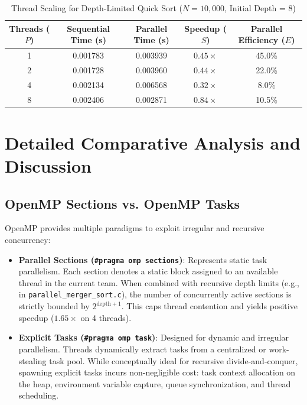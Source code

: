 \documentclass[12pt]{article}
\begin{document}
\begin{table}[H]
\centering
\caption{Thread Scaling for Depth-Limited Quick Sort ($N = 10,000$, Initial Depth = 8)}
\vspace{4pt}
\begin{tabular}{@{}ccccc@{}}
\toprule
\textbf{Threads ($P$)} & \textbf{Sequential Time (s)} & \textbf{Parallel Time (s)} & \textbf{Speedup ($S$)} & \textbf{Parallel Efficiency ($E$)} \\
\midrule
1 & 0.001783 & 0.003939 & $0.45\times$ & 45.0\% \\
2 & 0.001728 & 0.003960 & $0.44\times$ & 22.0\% \\
4 & 0.002134 & 0.006568 & $0.32\times$ & 8.0\% \\
8 & 0.002406 & 0.002871 & $0.84\times$ & 10.5\% \\
\bottomrule
\end{tabular}
\label{tab:depth_table}
\end{table}

\section{Detailed Comparative Analysis and Discussion}

\subsection{OpenMP Sections vs. OpenMP Tasks}
OpenMP provides multiple paradigms to exploit irregular and recursive concurrency:
\begin{itemize}
    \item \textbf{Parallel Sections (\texttt{\#pragma omp sections})}: Represents static task parallelism. Each section denotes a static block assigned to an available thread in the current team. When combined with recursive depth limits (e.g., in \texttt{parallel\_merger\_sort.c}), the number of concurrently active sections is strictly bounded by $2^{\text{depth}+1}$. This caps thread contention and yields positive speedup ($1.65\times$ on 4 threads).
    \item \textbf{Explicit Tasks (\texttt{\#pragma omp task})}: Designed for dynamic and irregular parallelism. Threads dynamically extract tasks from a centralized or work-stealing task pool. While conceptually ideal for recursive divide-and-conquer, spawning explicit tasks incurs non-negligible cost: task context allocation on the heap, environment variable capture, queue synchronization, and thread scheduling.
\end{itemize}
\end{document}
